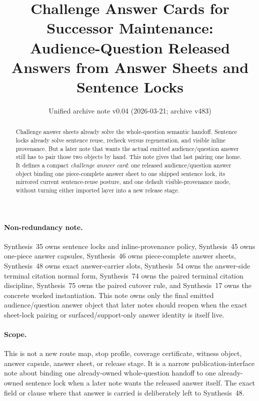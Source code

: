 \documentclass[11pt]{article}
\title{Challenge Answer Cards for Successor Maintenance:\\[0.5ex]
\large Audience-Question Released Answers from Answer Sheets and Sentence Locks}
\author{}
\date{Unified archive note v0.04 (2026-03-21; archive v483)}
\begin{document}
\maketitle

\begin{abstract}
Challenge answer sheets already solve the whole-question semantic handoff.
Sentence locks already solve sentence reuse, recheck versus regeneration, and visible inline provenance.
But a later note that wants the actual emitted audience/question answer still has to pair those two objects by hand.
This note gives that last pairing one home.
It defines a compact \emph{challenge answer card}: one released audience/question answer object binding one piece-complete answer sheet to one shipped sentence lock, its mirrored current sentence-reuse posture, and one default visible-provenance mode, without turning either imported layer into a new release stage.
\end{abstract}

\paragraph{Non-redundancy note.}
Synthesis~35 owns sentence locks and inline-provenance policy, Synthesis~45 owns one-piece answer capsules, Synthesis~46 owns piece-complete answer sheets, Synthesis~48 owns exact answer-carrier slots, Synthesis~54 owns the answer-side terminal citation normal form, Synthesis~74 owns the paired terminal citation discipline, Synthesis~75 owns the paired cutover rule, and Synthesis~17 owns the concrete worked instantiation.
This note owns only the final emitted audience/question answer object that later notes should reopen when the exact sheet-lock pairing or surfaced/support-only answer identity is itself live.

\paragraph{Scope.}
This is not a new route map, stop profile, coverage certificate, witness object, answer capsule, answer sheet, or release stage.
It is a narrow publication-interface note about binding one already-owned whole-question handoff to one already-owned sentence lock when a later note wants the released answer itself. The exact field or clause where that answer is carried is deliberately left to Synthesis~48.
\end{document}
